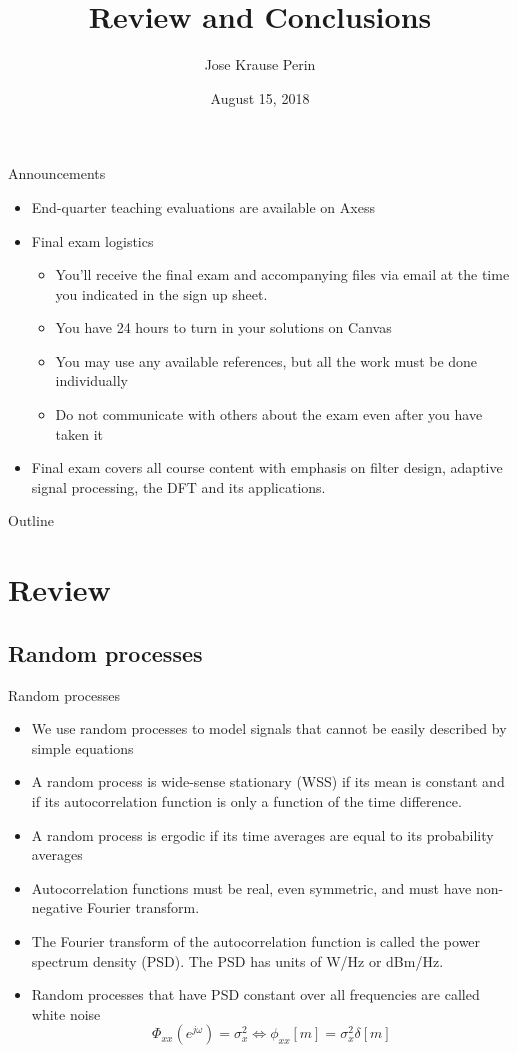 \documentclass[10pt, aspectratio=169]{beamer}
\title[EE 264]{Review and Conclusions}
\author{Jose Krause Perin}
\institute{Stanford University}
\date{August 15, 2018}
\begin{document}
\begin{frame}
  \titlepage
\end{frame}

%
\begin{frame}{Announcements}
\begin{itemize}
	\item End-quarter teaching evaluations are available on Axess
	\item Final exam logistics
	\begin{itemize} \normalsize
		\item You'll receive the final exam and accompanying files via email at the time you indicated in the sign up sheet.
		\item You have 24 hours to turn in your solutions on Canvas
		\item You may use any available references, but all the work must be done individually
		\item Do not communicate with others about the exam even after you have taken it
	\end{itemize}
	\item Final exam covers all course content with emphasis on filter design, adaptive signal processing, the DFT and its applications.
\end{itemize}
\end{frame}

%
\begin{frame}{Outline}
	\tableofcontents
\end{frame}

%
\section{Review}
\subsection{Random processes}
\begin{frame}{Random processes}
\begin{itemize}
	\item We use random processes to model signals that cannot be easily described by simple equations
	\item A random process is wide-sense stationary (WSS) if its mean is constant and if its autocorrelation function is only a function of the time difference. 
	\item A random process is ergodic if its time averages are equal to its probability averages
	\item Autocorrelation functions must be real, even symmetric, and must have non-negative Fourier transform.
	\item The Fourier transform of the autocorrelation function is called the power spectrum density (PSD). The PSD has units of W/Hz or dBm/Hz.
	\item Random processes that have PSD constant over all frequencies are called white noise
	\begin{equation*}
		\Phi_{xx}(e^{j\omega}) = \sigma_x^2 \Longleftrightarrow \phi_{xx}[m] = \sigma_x^2\delta[m] \tag{white noise}
	\end{equation*}
\end{itemize}
\end{frame}
\end{document}
